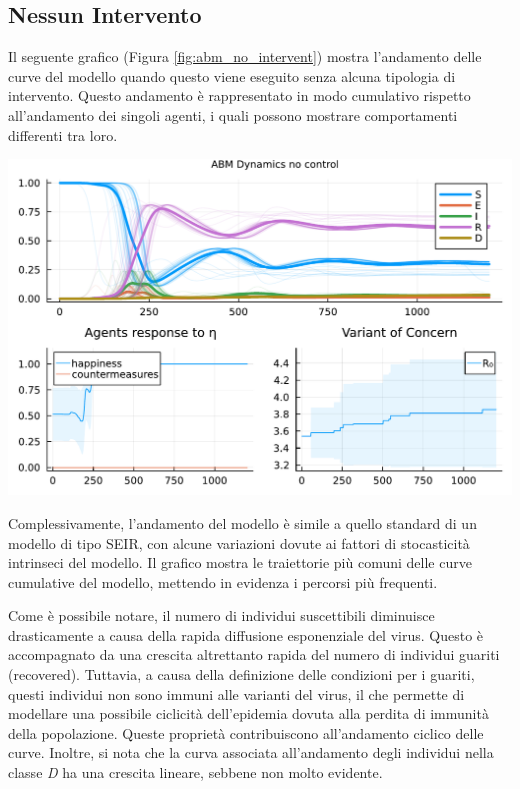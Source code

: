 \subsection{Nessun Intervento}

Il seguente grafico (Figura \ref{fig:abm_no_intervent}) mostra 
l'andamento delle curve del modello quando questo viene eseguito 
senza alcuna tipologia di intervento. Questo andamento è rappresentato 
in modo cumulativo rispetto all'andamento dei singoli agenti, 
i quali possono mostrare comportamenti differenti tra loro.

\begin{minipage}{\linewidth}
    \centering
    \includegraphics[width=\textwidth]{img/SocialNetworkABM_NO_CONTROL.pdf}
    \label{fig:abm_no_intervent}
\end{minipage}

Complessivamente, l'andamento del modello è simile a quello 
standard di un modello di tipo SEIR, con alcune variazioni 
dovute ai fattori di stocasticità intrinseci del modello. 
Il grafico mostra le traiettorie più comuni delle curve cumulative 
del modello, mettendo in evidenza i percorsi più frequenti.

Come è possibile notare, il numero di individui suscettibili 
diminuisce drasticamente a causa della rapida diffusione 
esponenziale del virus. Questo è accompagnato da una crescita 
altrettanto rapida del numero di individui guariti (recovered). 
Tuttavia, a causa della definizione delle condizioni per i guariti, 
questi individui non sono immuni alle varianti del virus, il che 
permette di modellare una possibile ciclicità dell'epidemia 
dovuta alla perdita di immunità della popolazione. 
Queste proprietà contribuiscono all'andamento ciclico delle curve. 
Inoltre, si nota che la curva associata all'andamento degli 
individui nella classe \emph{D} ha una crescita lineare, 
sebbene non molto evidente.

